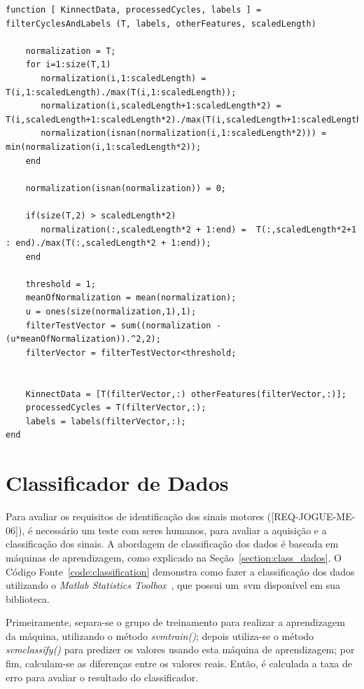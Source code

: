 	\begin{lstlisting}[frame=single, caption=Filtro para remoção de ciclos, label=code:filtercycles]
function [ KinnectData, processedCycles, labels ] = filterCyclesAndLabels (T, labels, otherFeatures, scaledLength)

    normalization = T;
    for i=1:size(T,1)
       normalization(i,1:scaledLength) = T(i,1:scaledLength)./max(T(i,1:scaledLength));
       normalization(i,scaledLength+1:scaledLength*2) = T(i,scaledLength+1:scaledLength*2)./max(T(i,scaledLength+1:scaledLength*2));
       normalization(isnan(normalization(i,1:scaledLength*2))) = min(normalization(i,1:scaledLength*2));
    end
    
    normalization(isnan(normalization)) = 0;
    
    if(size(T,2) > scaledLength*2) 
       normalization(:,scaledLength*2 + 1:end) =  T(:,scaledLength*2+1 : end)./max(T(:,scaledLength*2 + 1:end));
    end
    
    threshold = 1;
    meanOfNormalization = mean(normalization);
    u = ones(size(normalization,1),1);
    filterTestVector = sum((normalization - (u*meanOfNormalization)).^2,2);
    filterVector = filterTestVector<threshold;
    
       
    KinnectData = [T(filterVector,:) otherFeatures(filterVector,:)];
    processedCycles = T(filterVector,:);
    labels = labels(filterVector,:);    
end
\end{lstlisting}	


\section{Classificador de Dados}
Para avaliar os requisitos de identificação dos sinais motores ([REQ-JOGUE-ME-06]), é necessário um teste com seres humanos, para avaliar a aquisição e a classificação dos sinais. A abordagem de classificação dos dados é baseada em máquinas de aprendizagem, como explicado na Seção~\ref{section:class_dados}. O Código Fonte~\ref{code:classification} demonstra como fazer a classificação dos dados utilizando o \textit{Matlab Statistics Toolbox}~\cite{matlab2011}, que possui um~\ac{svm} disponível em sua biblioteca.

Primeiramente, separa-se o grupo de treinamento para realizar a aprendizagem da máquina, utilizando o método \textit{svmtrain()}; depois utiliza-se o método \textit{svmclassify()} para predizer os valores usando esta máquina de aprendizagem; por fim, calculam-se as diferenças entre os valores reais. Então, é calculada a taxa de erro para avaliar o resultado do classificador.

